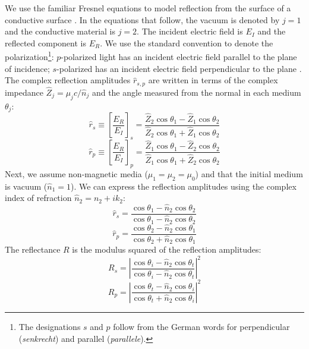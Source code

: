 We use the familiar Fresnel equations to model reflection from the surface of a conductive surface \cite{zangwillModernElectrodynamics2013}. In the equations that follow, the vacuum is denoted by $j=1$ and the conductive material is $j=2$. The incident electric field is $E_I$ and the reflected component is $E_R$. We use the standard convention to denote the polarization\footnote{The designations $s$ and $p$ follow from the German words for perpendicular (\textit{senkrecht}) and parallel (\textit{parallele}).}: $p$-polarized light has an incident electric field parallel to the plane of incidence; $s$-polarized has an incident electric field perpendicular to the plane \cite{attwoodSoftXraysExtreme2000}. The complex reflection amplitudes $\hat{r}_{s,p}$ are written in terms of the complex impedance $\hat{Z}_j = \mu_j c / \hat{n}_j$ and the angle measured from the normal in each medium $\theta_j$:
\begin{equation}
\hat{r}_s \equiv \left[ \frac{E_R}{E_I} \right]_s = \frac{\hat{Z}_2 \cos \theta_1 - \hat{Z}_1 \cos \theta_2}{\hat{Z}_2 \cos \theta_1 + \hat{Z}_1 \cos \theta_2}
\label{eqn:Fresnel_rs_1}
\end{equation}
\begin{equation}
\hat{r}_p \equiv \left[ \frac{E_R}{E_I} \right]_p = \frac{\hat{Z}_1 \cos \theta_1 - \hat{Z}_2 \cos \theta_2}{\hat{Z}_1 \cos \theta_1 + \hat{Z}_2 \cos \theta_2}
\label{eqn:Fresnel_rp_1}
\end{equation}
Next, we assume non-magnetic media ($\mu_1=\mu_2=\mu_0$) and that the initial medium is vacuum ($\hat{n}_1 = 1$). We can express the reflection amplitudes using the complex index of refraction $\hat{n}_2 = n_2 + i k_2$:
\begin{equation}
\hat{r}_s = \frac{ \cos \theta_1 - \hat{n}_2 \cos \theta_2}{ \cos \theta_1 - \hat{n}_2 \cos \theta_2}
\label{eqn:Fresnel_rs_2}
\end{equation}
\begin{equation}
\hat{r}_p = \frac{ \cos \theta_2 - \hat{n}_2 \cos \theta_1}{ \cos \theta_2 + \hat{n}_2 \cos \theta_1}
\label{eqn:Fresnel_rp_2}
\end{equation}
The reflectance $R$ is the modulus squared of the reflection amplitudes:
\begin{equation}
R_s = \left| \frac{ \cos \theta_i - \hat{n}_2 \cos \theta_t}{ \cos \theta_i - \hat{n}_2 \cos \theta_t} \right|^2
\label{eqn:Fresnel_Rs_1}
\end{equation}
\begin{equation}
R_p = \left| \frac{ \cos \theta_t - \hat{n}_2 \cos \theta_i}{ \cos \theta_t + \hat{n}_2 \cos \theta_i} \right|^2
\label{eqn:Fresnel_Rp_1}
\end{equation}
